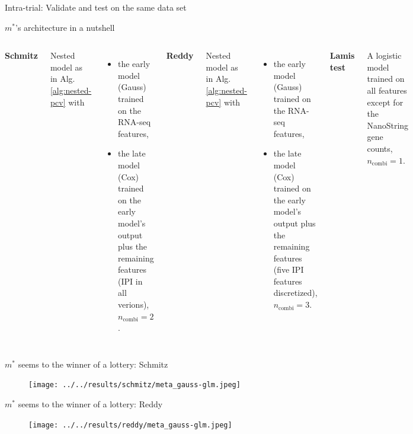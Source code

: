 \documentclass[10pt, aspectratio=169]{beamer}
\begin{document}
\begin{frame}{Intra-trial: Validate and test on the same data set}
  
\end{frame}

\begin{frame}{$m^*$'s architecture in a nutshell}
  \small
  \begin{columns}[T]
      \textbf{Schmitz}\par
      Nested model as in Alg. \ref{alg:nested-pcv} with
      \begin{itemize}
        \item the early model (Gauss) trained on the 
            RNA-seq features,
        \item the late model (Cox) trained on the early model's output plus the 
          remaining features (IPI in all verions), $n_\text{combi} = 2$.
      \end{itemize}
      \textbf{Reddy}\par
      Nested model as in Alg. \ref{alg:nested-pcv} with
      \begin{itemize}
        \item the early model (Gauss) trained on the 
            RNA-seq features,
        \item the late model (Cox) trained on the early model's output plus the 
          remaining features (five IPI features discretized), 
          $n_\text{combi} = 3$.
      \end{itemize}
      \textbf{Lamis test}\par
      A logistic model trained on all features except for the NanoString gene 
      counts, $n_\text{combi} = 1$.
  \end{columns} 
\end{frame}

\begin{frame}{$m^*$ seems to the winner of a lottery: Schmitz}
  \begin{figure}[h]
    \centering
    \texttt{[image: ../../results/schmitz/meta\_gauss-glm.jpeg]}
  \end{figure}
\end{frame}

\begin{frame}{$m^*$ seems to the winner of a lottery: Reddy}
  \begin{figure}[h]
    \centering
    \texttt{[image: ../../results/reddy/meta\_gauss-glm.jpeg]}
  \end{figure}
\end{frame}
\end{document}
